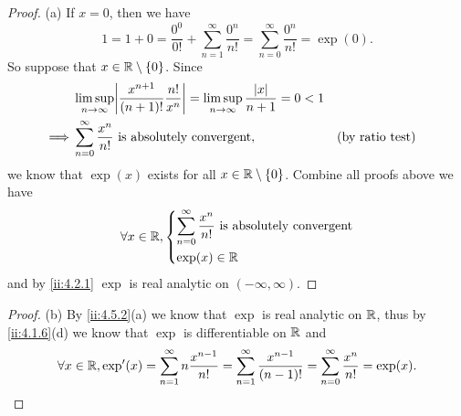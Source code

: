 \begin{proof}{(a)}
  If \(x = 0\), then we have
  \[
    1 = 1 + 0 = \dfrac{0^0}{0!} + \sum_{n = 1}^\infty \dfrac{0^n}{n!} = \sum_{n = 0}^\infty \dfrac{0^n}{n!} = \exp(0).
  \]
  So suppose that \(x \in \mathbb{R} \setminus \left\lbrace0\right\rbrace\).
  Since
  \begin{align*}
             & \limsup_{n \to \infty} \abs{\dfrac{x^{n + 1}}{(n + 1)!} \dfrac{n!}{x^n}} = \limsup_{n \to \infty} \dfrac{\abs{x}}{n + 1} = 0 < 1                             \\
    \implies & \sum_{n = 0}^\infty \dfrac{x^n}{n!} \text{ is absolutely convergent},                                                            &  & \text{(by ratio test)}
  \end{align*}
  we know that \(\exp(x)\) exists for all \(x \in \mathbb{R} \setminus \left\lbrace0\right\rbrace\).
  Combine all proofs above we have
  \[
    \forall x \in \mathbb{R}, \begin{dcases}
      \sum_{n = 0}^\infty \dfrac{x^n}{n!} \text{ is absolutely convergent} \\
      \exp(x) \in \mathbb{R}
    \end{dcases}
  \]
  and by \cref{ii:4.2.1} \(\exp\) is real analytic on \((-\infty, \infty)\).
\end{proof}

\begin{proof}{(b)}
  By \cref{ii:4.5.2}(a) we know that \(\exp\) is real analytic on \(\mathbb{R}\), thus by \cref{ii:4.1.6}(d) we know that \(\exp\) is differentiable on \(\mathbb{R}\) and
  \[
    \forall x \in \mathbb{R}, \exp'(x) = \sum_{n = 1}^\infty n \dfrac{x^{n - 1}}{n!} = \sum_{n = 1}^\infty \dfrac{x^{n - 1}}{(n - 1)!} = \sum_{n = 0}^\infty \dfrac{x^n}{n!} = \exp(x).
  \]
\end{proof}

